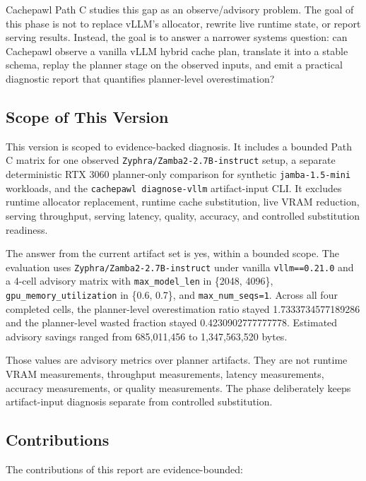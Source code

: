 \documentclass[11pt]{article}
\begin{document}
Cachepawl Path C studies this gap as an observe/advisory problem. The goal of
this phase is not to replace vLLM's allocator, rewrite live runtime state, or
report serving results. Instead, the goal is to answer a narrower systems
question: can Cachepawl observe a vanilla vLLM hybrid cache plan, translate it
into a stable schema, replay the planner stage on the observed inputs, and emit
a practical diagnostic report that quantifies planner-level overestimation?

\subsection{Scope of This Version}

This version is scoped to evidence-backed diagnosis. It includes a bounded Path
C matrix for one observed \texttt{Zyphra/Zamba2-2.7B-instruct} setup, a
separate deterministic RTX 3060 planner-only comparison for synthetic
\texttt{jamba-1.5-mini} workloads, and the \texttt{cachepawl diagnose-vllm}
artifact-input CLI. It excludes runtime allocator replacement, runtime cache
substitution, live VRAM reduction, serving throughput, serving latency,
quality, accuracy, and controlled substitution readiness.

The answer from the current artifact set is yes, within a bounded scope. The
evaluation uses \texttt{Zyphra/Zamba2-2.7B-instruct} under vanilla
\texttt{vllm==0.21.0} and a 4-cell advisory matrix with
\texttt{max\_model\_len} in \{2048, 4096\},
\texttt{gpu\_memory\_utilization} in \{0.6, 0.7\}, and
\texttt{max\_num\_seqs=1}. Across all four completed cells, the planner-level
overestimation ratio stayed 1.7333734577189286 and the planner-level wasted
fraction stayed 0.4230902777777778. Estimated advisory savings ranged from
685,011,456 to 1,347,563,520 bytes.

Those values are advisory metrics over planner artifacts. They are not runtime
VRAM measurements, throughput measurements, latency measurements, accuracy
measurements, or quality measurements. The phase deliberately keeps
artifact-input diagnosis separate from controlled substitution.

\subsection{Contributions}

The contributions of this report are evidence-bounded:
\end{document}

